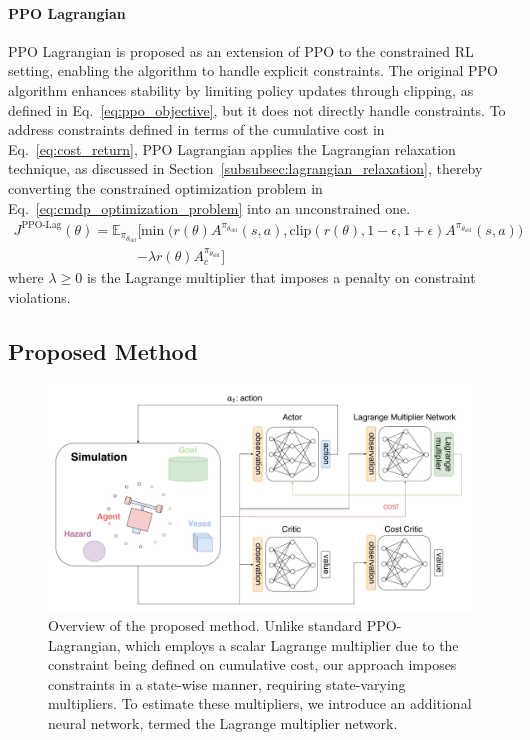\paragraph{PPO Lagrangian}

PPO Lagrangian is proposed as an extension of PPO to the constrained RL setting, enabling the algorithm to handle explicit constraints.
The original PPO algorithm enhances stability by limiting policy updates through clipping, as defined in Eq.~\ref{eq:ppo_objective}, but it does not directly handle constraints.
To address constraints defined in terms of the cumulative cost in Eq.~\ref{eq:cost_return}, PPO Lagrangian applies the Lagrangian relaxation technique, as discussed in Section~\ref{subsubsec:lagrangian_relaxation}, thereby converting the constrained optimization problem in Eq.~\ref{eq:cmdp_optimization_problem} into an unconstrained one.
\begin{equation} \label{eq:ppo_lagrangian_objective}
    \begin{aligned} J^{\text{PPO-Lag}}(\theta)
        = \mathbb{E}_{\pi_{\theta_\text{old}}} \Big[ &\min \big( r(\theta) A^{\pi_{\theta_\text{old}}}(s, a), \text{clip}(r(\theta), 1 - \epsilon, 1 + \epsilon) A^{\pi_{\theta_\text{old}}}(s, a) \big)
        \\ &- \lambda r(\theta) A^{\pi_{\theta_\text{old}}}_c \Big]
    \end{aligned}
\end{equation}
where $\lambda \geq 0$ is the Lagrange multiplier that imposes a penalty on constraint violations.



\subsection{Proposed Method}



\begin{figure}[h]
    \centering

    \includegraphics[width=0.8\linewidth]{figure/ppo_lagnet.pdf}
    \caption{Overview of the proposed method.
            Unlike standard PPO-Lagrangian, which employs a scalar Lagrange multiplier due to the constraint being defined on cumulative cost, our approach imposes constraints in a state-wise manner, requiring state-varying multipliers. 
            To estimate these multipliers, we introduce an additional neural network, termed the Lagrange multiplier network.}
    \label{fig:ppo_lagnet}
\end{figure}

